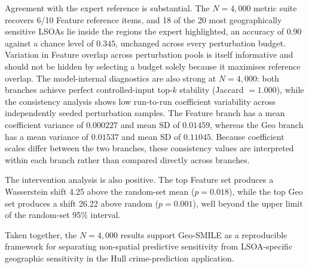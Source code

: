Agreement with the expert reference is substantial. The $N=4{,}000$ metric suite recovers 6/10 Feature reference items, and 18 of the 20 most geographically sensitive LSOAs lie inside the regions the expert highlighted, an accuracy of $0.90$ against a chance level of $0.345$, unchanged across every perturbation budget. Variation in Feature overlap across perturbation pools is itself informative and should not be hidden by selecting a budget solely because it maximises reference overlap. The model-internal diagnostics are also strong at \(N=4{,}000\): both branches achieve perfect controlled-input top-\(k\) stability (Jaccard \(=1.000\)), while the consistency analysis shows low run-to-run coefficient variability across independently seeded perturbation samples. The Feature branch has a mean coefficient variance of \(0.000227\) and mean SD of \(0.01459\), whereas the Geo branch has a mean variance of \(0.01537\) and mean SD of \(0.11045\). Because coefficient scales differ between the two branches, these consistency values are interpreted within each branch rather than compared directly across branches.

The intervention analysis is also positive. The top Feature set produces a Wasserstein shift 4.25 above the random-set mean ($p=0.018$), while the top Geo set produces a shift 26.22 above random ($p=0.001$), well beyond the upper limit of the random-set 95\% interval.

Taken together, the $N=4{,}000$ results support Geo-SMILE as a reproducible framework for separating non-spatial predictive sensitivity from LSOA-specific geographic sensitivity in the Hull crime-prediction application.

